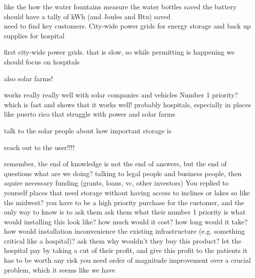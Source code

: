 \documentclass[12pt]{article}
\begin{document}
like the how the water fountains measure the water bottles saved the battery should have a tally of kWh (and Joules and Btu) saved\\

need to find key customers. City-wide power grids for energy storage and back up supplies for hospital

first city-wide power grids. that is slow, so while permitting is happening we should focus on hospitals

also solar farms!

works really really well with solar companies and vehicles
Number 1 priority? which is fast and shows that it works well! probably hospitals, especially in places like puerto rico that struggle with power and solar farms

talk to the solar people about how important storage is

reach out to the user!!!!

remember, the end of knowledge is not the end of answers, but the end of questions
what are we doing?
talking to legal people and business people, then aquire necessary funding (grants, loans, vc, other investors)
You replied to yourself
places that need storage without having access to inclines or lakes
so like the midwest?
you have to be a high priority purchase for the customer, and the only way to know is to ask them
ask them what their number 1 priority is
what would installing this look like? how much would it cost? how long would it take? how would installation inconvenience the existing infrastructure (e.g. something critical like a hospital)?
ask them why wouldn't they buy this product?
let the hospital pay by taking a cut of their profit, and give this profit to the patients
it has to be worth any risk
you need order of magnitude improvement over a crucial problem, which it seems like we have
\end{document}
